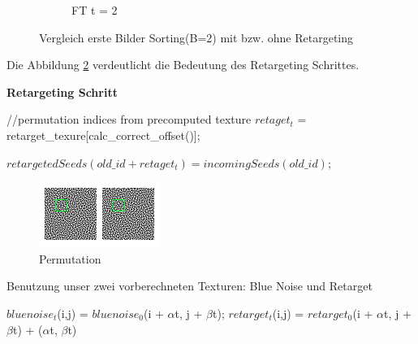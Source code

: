 \begin{figure}[H]
\begin{subfigure}[b]{0.2\linewidth}
         \caption{FT t = 2}
         \label{pic:retarget_t2}
    \end{subfigure}
    \caption{Vergleich erste Bilder Sorting(B=2) mit bzw. ohne Retargeting}
    \label{fig:VergleichRetargetSorting}
      
\end{figure}

Die Abbildung \ref{fig:VergleichRetargetSorting} verdeutlicht die Bedeutung des Retargeting 
Schrittes.

\begin{algorithm}[H]
    \caption{\textbf{Retargeting Schritt}}
    \begin{algorithmic}[1]
        \State //permutation indices from precomputed texture
        \State $retaget_{t}$ = retarget\_texure[calc\_correct\_offset()];
        
        \State $retargetedSeeds(old\_id + retaget_{t}) = incomingSeeds(old\_id);$
        
    \end{algorithmic}
    \label{alg:retargetingAlg}
\end{algorithm}

\begin{figure}[H]\label{pic:Permutation}
    \centering
    \includegraphics[width=0.5\linewidth]{content/simulatedAnnealing/Bilder/Permutation.png}
    \caption{Permutation}
\end{figure}

\begin{algorithm}[H]
    \caption{Benutzung unser zwei vorberechneten Texturen: Blue Noise und Retarget}
    \begin{algorithmic}[1]
        \State $bluenoise_{t}$(i,j) = $bluenoise_{0}$(i + $\alpha$t, j + $\beta$t); 
        \State $retarget_{t}$(i,j) = $retarget_{0}$(i + $\alpha$t, j + $\beta$t) + ($\alpha$t, $\beta$t)
    \end{algorithmic}
    \label{alg:Benutzung vorberechneter Texturen}
\end{algorithm}


